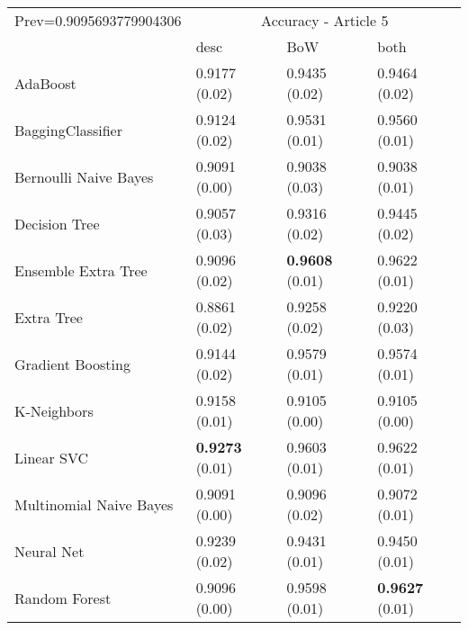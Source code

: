 \begin{tabular}{|l|l|l|l| }
\hline
Prev=0.9095693779904306 &  \multicolumn{3}{c|}{Accuracy - Article 5} \\
\cline{2-4} & desc & BoW & both \\ \hline
AdaBoost                & 0.9177 (0.02) & 0.9435 (0.02) & 0.9464 (0.02)\\
BaggingClassifier       & 0.9124 (0.02) & 0.9531 (0.01) & 0.9560 (0.01)\\
Bernoulli Naive Bayes   & 0.9091 (0.00) & 0.9038 (0.03) & 0.9038 (0.01)\\
Decision Tree           & 0.9057 (0.03) & 0.9316 (0.02) & 0.9445 (0.02)\\
Ensemble Extra Tree     & 0.9096 (0.02) & {\bf 0.9608} (0.01) & 0.9622 (0.01)\\
Extra Tree              & 0.8861 (0.02) & 0.9258 (0.02) & 0.9220 (0.03)\\
Gradient Boosting       & 0.9144 (0.02) & 0.9579 (0.01) & 0.9574 (0.01)\\
K-Neighbors             & 0.9158 (0.01) & 0.9105 (0.00) & 0.9105 (0.00)\\
Linear SVC              & {\bf 0.9273} (0.01) & 0.9603 (0.01) & 0.9622 (0.01)\\
Multinomial Naive Bayes & 0.9091 (0.00) & 0.9096 (0.02) & 0.9072 (0.01)\\
Neural Net              & 0.9239 (0.02) & 0.9431 (0.01) & 0.9450 (0.01)\\
Random Forest           & 0.9096 (0.00) & 0.9598 (0.01) & {\bf 0.9627} (0.01)\\
\hline
\end{tabular}